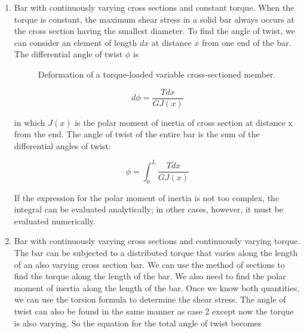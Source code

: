 \documentclass[
10pt,
a4paper,
openany,
svgnames,
]{book}
\begin{document}
\begin{enumerate}
\item Bar with continuously varying cross sections and constant torque. When the torque is constant, the maximum shear stress in a solid bar always occurs at the cross section having the smallest diameter. To find the angle of twist, we can consider an element of length $dx$ at distance $x$ from one end of the bar. The differential angle of twist $\phi$ is

  \begin{figure}[h]
    \centering
    \caption{Deformation of a torque-loaded variable cross-sectioned member.}
  \end{figure}
  
  \[d\phi  = \frac{Tdx}{GJ(x)}\]

  in which $J(x)$ is the polar moment of inertia of cross section at distance x from the end. The angle of twist of the entire bar is the sum of the differential angles of twist:

  \begin{equation}
    \phi  = \int_0^L \frac{Tdx}{GJ(x)}
  \end{equation}

  If the expression for the polar moment of inertia is not too complex, the integral can be evaluated analytically; in other cases, however, it must be evaluated numerically.

\item Bar with continuously varying cross sections and continuously varying torque. The bar can be subjected to a distributed torque that varies along the length of an also varying cross section bar. We can use the method of sections to find the torque along the length of the bar. We also need to find the polar moment of inertia along the length of the bar. Once we know both quantities, we can use the torsion formula to determine the shear stress. The angle of twist can also be found in the same manner as case 2 except now the torque is also varying. So the equation for the total angle of twist becomes
  

\end{enumerate}
\end{document}
